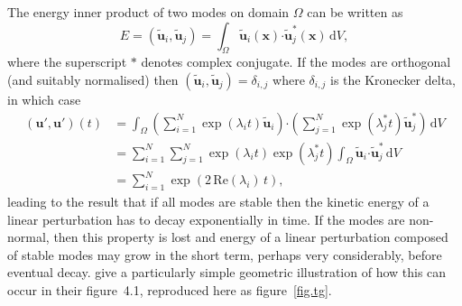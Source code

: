 \documentclass[11pt,a4paper]{report}
\newcommand\cd{\mathrm{d}}
\newcommand\wt[1]{\widetilde{#1}}
\newcommand\upert{{\bm{u}'}}
\newcommand\xvec{\bm{x}}
\newcommand\uvec{\bm{u}}
\begin{document}
The energy inner product of two modes on domain $\Omega$ can be
written as
\begin{equation}
E=(\wt{\bm{u}}_i, \wt{\bm{u}}_j) = \int_\Omega \wt{\bm{u}}_i
  (\xvec)\bm{\cdot} \wt{\bm{u}}_j^\ast(\xvec)\,\cd V,
\end{equation}
where the superscript $\ast$ denotes complex conjugate.  If the modes
are orthogonal (and suitably normalised) then $(\wt{\bm{u}}_i,
\wt{\bm{u}}_j)=\delta_{i,j}$ where $\delta_{i,j}$ is the Kronecker
delta, in which case
\begin{align}
\nonumber
(\upert,\upert)(t)&=
\int_\Omega\left(\sum_{i=1}^N\exp(\lambda_i t)
\wt{\uvec}_i\right)\bm{\cdot}
\left(\sum_{j=1}^N\exp(\lambda_j^\ast t)\wt{\uvec}_j^\ast\right)\,\cd V\\
\nonumber
& =\sum_{i=1}^N\sum_{j=1}^N
\exp(\lambda_i t)\exp(\lambda_j^\ast t)
\int_\Omega\wt{\uvec}_i\bm{\cdot}\wt{\uvec}_j^\ast\,\cd V\\
&=\sum_{i=1}^N\exp(2\,\text{Re}(\lambda_i)\, t),
\end{align}
leading to the result that if all modes are stable then the kinetic
energy of a linear perturbation has to decay exponentially in time.
If the modes are non-normal, then this property is lost and energy of
a linear perturbation composed of stable modes may grow in the short
term, perhaps very considerably, before eventual decay.
\citet{schmid01} give a particularly simple geometric illustration of
how this can occur in their figure~4.1, reproduced here as
figure~\ref{fig.tg}.
\end{document}
